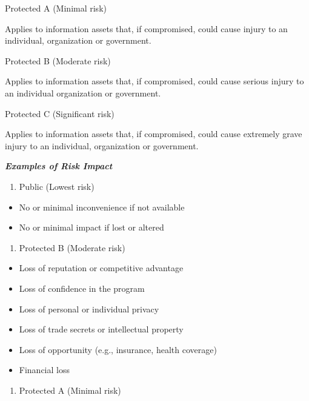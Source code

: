 \documentclass[]{book}
\providecommand{\tightlist}{%
  \setlength{\itemsep}{0pt}\setlength{\parskip}{0pt}}
\begin{document}
Protected A (Minimal risk)

Applies to information assets that, if compromised, could cause injury to an individual, organization or government.

Protected B (Moderate risk)

Applies to information assets that, if compromised, could cause serious injury to an individual organization or government.

Protected C (Significant risk)

Applies to information assets that, if compromised, could cause extremely grave injury to an individual, organization or government.

\textbf{\emph{Examples of Risk Impact}}

\begin{enumerate}
\def\labelenumi{\arabic{enumi}.}
\tightlist
\item
  Public (Lowest risk)
\end{enumerate}

\begin{itemize}
\tightlist
\item
  No or minimal inconvenience if not available
\item
  No or minimal impact if lost or altered
\end{itemize}

\begin{enumerate}
\def\labelenumi{\arabic{enumi}.}
\setcounter{enumi}{2}
\tightlist
\item
  Protected B (Moderate risk)
\end{enumerate}

\begin{itemize}
\tightlist
\item
  Loss of reputation or competitive advantage
\item
  Loss of confidence in the program
\item
  Loss of personal or individual privacy
\item
  Loss of trade secrets or intellectual property
\item
  Loss of opportunity (e.g., insurance, health coverage)
\item
  Financial loss
\end{itemize}

\begin{enumerate}
\def\labelenumi{\arabic{enumi}.}
\setcounter{enumi}{1}
\tightlist
\item
  Protected A (Minimal risk)
\end{enumerate}
\end{document}
